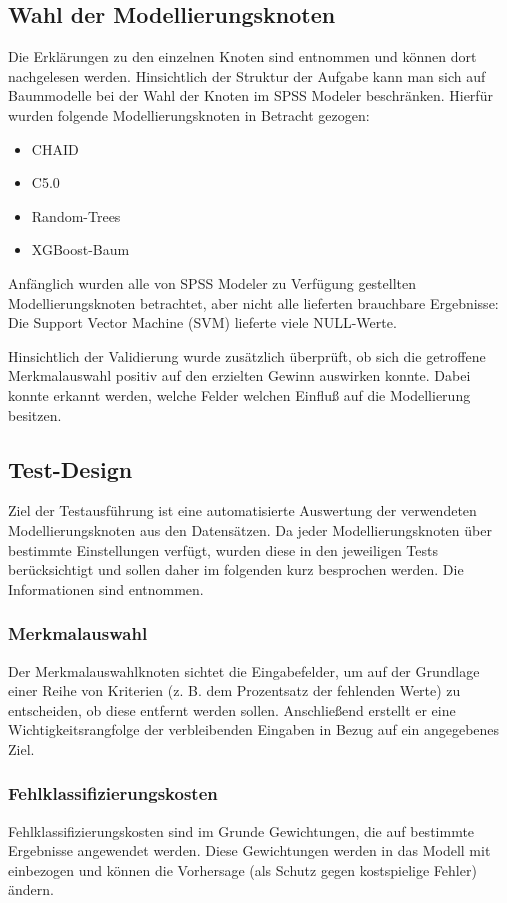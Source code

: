 \documentclass[a4paper,12pt]{article}
\begin{document}
\subsection{Wahl der Modellierungsknoten}
Die Erklärungen zu den einzelnen Knoten sind \cite{nodes} entnommen und können dort nachgelesen werden. 
Hinsichtlich der Struktur der Aufgabe kann man sich auf Baummodelle bei der Wahl der Knoten im SPSS Modeler beschränken. Hierfür wurden folgende Modellierungsknoten in Betracht gezogen:
\begin{itemize}
\item CHAID
\item C5.0
	\item Random-Trees
	\item XGBoost-Baum
\end{itemize} 

Anfänglich  wurden alle von SPSS Modeler zu Verfügung gestellten Modellierungsknoten betrachtet, aber nicht alle lieferten brauchbare
Ergebnisse: Die Support Vector Machine (SVM) lieferte viele NULL-Werte.
\par
Hinsichtlich der Validierung wurde zusätzlich überprüft, ob sich die getroffene Merkmalauswahl positiv auf den erzielten Gewinn auswirken konnte. Dabei konnte erkannt werden, welche Felder welchen Einfluß auf die Modellierung besitzen.

\subsection{Test-Design}
Ziel der Testausführung ist eine automatisierte Auswertung der verwendeten Modellierungsknoten aus den Datensätzen. Da jeder Modellierungsknoten über bestimmte Einstellungen verfügt, wurden diese in den jeweiligen Tests berücksichtigt und sollen daher im folgenden kurz besprochen werden. Die Informationen sind \cite{nodes} entnommen.

\subsubsection{Merkmalauswahl}
Der Merkmalauswahlknoten sichtet die Eingabefelder, um auf der Grundlage einer Reihe von
Kriterien (z. B. dem Prozentsatz der fehlenden Werte) zu entscheiden, ob diese entfernt werden sollen. 
Anschließend erstellt er eine Wichtigkeitsrangfolge der verbleibenden Eingaben in Bezug auf ein angegebenes Ziel. 

\subsubsection{Fehlklassifizierungskosten}
Fehlklassifizierungskosten sind im Grunde Gewichtungen, die auf bestimmte Ergebnisse angewendet
werden. Diese Gewichtungen werden in das Modell mit einbezogen und können die Vorhersage (als Schutz gegen kostspielige Fehler) ändern. 
\end{document}
